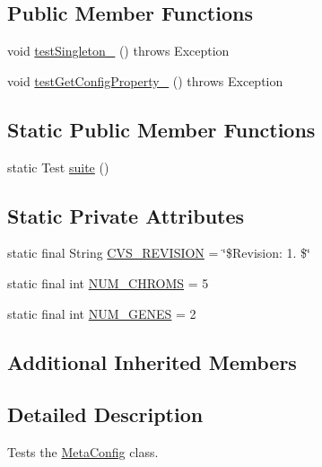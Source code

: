 \subsection*{Public Member Functions}
\begin{DoxyCompactItemize}
\item 
void \hyperlink{classorg_1_1jgap_1_1data_1_1config_1_1_meta_config_test_aeab1e8c026398f5ad33b334761b1ddb9}{test\-Singleton\-\_} ()  throws Exception 
\item 
void \hyperlink{classorg_1_1jgap_1_1data_1_1config_1_1_meta_config_test_ab9a92d8fe03dc77ae21e3c08557dfc48}{test\-Get\-Config\-Property\-\_} ()  throws Exception 
\end{DoxyCompactItemize}
\subsection*{Static Public Member Functions}
\begin{DoxyCompactItemize}
\item 
static Test \hyperlink{classorg_1_1jgap_1_1data_1_1config_1_1_meta_config_test_ae2a34c40941c26c25f1a200807494778}{suite} ()
\end{DoxyCompactItemize}
\subsection*{Static Private Attributes}
\begin{DoxyCompactItemize}
\item 
static final String \hyperlink{classorg_1_1jgap_1_1data_1_1config_1_1_meta_config_test_aabf433ec816a5560c9973d231a0d58a4}{C\-V\-S\-\_\-\-R\-E\-V\-I\-S\-I\-O\-N} = \char`\"{}\$Revision\-: 1. \$\char`\"{}
\item 
static final int \hyperlink{classorg_1_1jgap_1_1data_1_1config_1_1_meta_config_test_a5f2339c96b8059c05d76c2b32afef6fc}{N\-U\-M\-\_\-\-C\-H\-R\-O\-M\-S} = 5
\item 
static final int \hyperlink{classorg_1_1jgap_1_1data_1_1config_1_1_meta_config_test_a662b5ac959bf31e901598913caeee288}{N\-U\-M\-\_\-\-G\-E\-N\-E\-S} = 2
\end{DoxyCompactItemize}
\subsection*{Additional Inherited Members}


\subsection{Detailed Description}
Tests the \hyperlink{classorg_1_1jgap_1_1data_1_1config_1_1_meta_config}{Meta\-Config} class.

